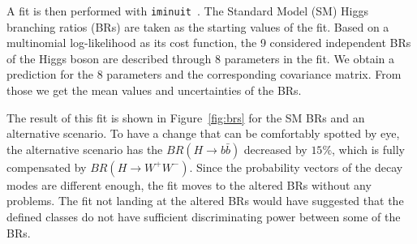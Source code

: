 \documentclass[11pt, hidelinks, a4paper]{scrartcl}
\begin{document}
A fit is then performed with \texttt{iminuit}~\cite{Minuit,iminuit}.
The Standard Model (SM) Higgs branching ratios (BRs)
are taken
as the starting values of the fit.
Based on a multinomial log-likelihood as its cost function,
the 9 considered independent BRs of the Higgs boson
are described through 8 parameters in the fit.
We obtain a prediction for the 8 parameters
and the corresponding covariance matrix.
From those we get the mean values and uncertainties of the BRs.

The result of this fit is shown in Figure~\ref{fig:brs} for
the SM BRs and an alternative scenario.
To have a change that can be comfortably spotted by eye,
the alternative scenario has the $BR(H \to b \bar{b})$ decreased by $15\%$,
which is fully compensated by $BR(H \to W^+W^-)$.
Since the probability vectors of the decay modes are different enough,
the fit moves to the altered BRs without any problems.
The fit not landing at the altered BRs
would have suggested that the defined classes
do not have sufficient discriminating power
between some of the BRs.
\end{document}
